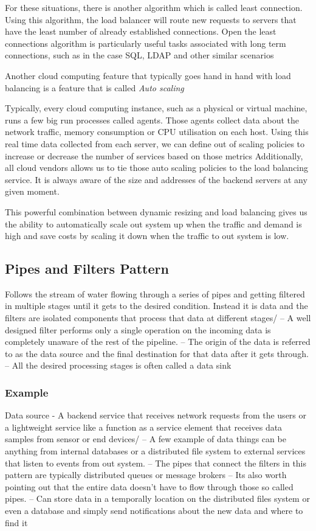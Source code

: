 \documentclass[a4paper, 11pt]{book}
\begin{document}
    For these situations, there is another algorithm which is called least connection.
    Using this algorithm, the load balancer will route new requests to servers that have the least number of already established connections.
    Open the least connections algorithm is particularly useful tasks associated with long term connections, such as in the case SQL, LDAP and other similar scenarios

    Another cloud computing feature that typically goes hand in hand with load balancing is a feature that is called \textit{Auto scaling}

    Typically, every cloud computing instance, such as a physical or virtual machine, runs a few big run processes called agents.
    Those agents collect data about the network traffic, memory consumption or CPU utilisation on each host.
    Using this real time data collected from each server, we can define out of scaling policies to increase or decrease the number of services based on those metrics
    Additionally, all cloud vendors allows us to tie those auto scaling policies to the load balancing service.
    It is always aware of the size and addresses of the backend servers at any given moment.

    This powerful combination between dynamic resizing and load balancing gives us the ability to automatically scale out system up when the traffic and demand is high and save costs by scaling it down when the traffic to out system is low.

    \subsection{Pipes and Filters Pattern}
    Follows the stream of water flowing through a series of pipes and getting filtered in multiple stages until it gets to the desired condition.
    Instead it is data and the filters are isolated components that process that data at different stages/
    -- A well designed filter performs only a single operation on the incoming data is completely unaware of the rest of the pipeline.
    -- The origin of the data is referred to as the data source and the final destination for that data after it gets through.
    -- All the desired processing stages is often called a data sink

    \subsubsection{Example}
    Data source - A backend service that receives network requests from the users or a lightweight service like a function as a service element that receives data samples from sensor or end devices/
    -- A few example of data things can be anything from internal databases or a distributed file system to external services that listen to events from out system.
    -- The pipes that connect the filters in this pattern are typically distributed queues or message brokers
    -- Its also worth pointing out that the entire data doesn't have to flow through those so called pipes.
    -- Can store data in a temporally location on the distributed files system or even a database and simply send notifications about the new data and where to find it
\end{document}
